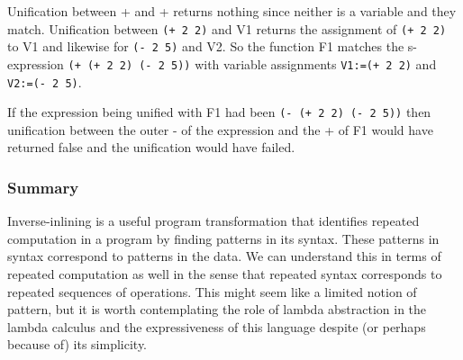 \documentclass[a4paper,10pt]{article}
\begin{document}
Unification between + and + returns nothing since neither is a variable and they match.  Unification between \texttt{(+ 2 2)} and V1 returns the assignment of \texttt{(+ 2 2)} to V1 and likewise for \texttt{(- 2 5)} and V2.  So the function F1 matches the s-expression \texttt{(+ (+ 2 2) (- 2 5))} with variable assignments \texttt{V1:=(+ 2 2)} and \texttt{V2:=(- 2 5)}.

If the expression being unified with F1 had been \texttt{(- (+ 2 2) (- 2 5))} then unification between the outer - of the expression and the + of F1 would have returned false and the unification would have failed.

\subsubsection{Summary}
Inverse-inlining is a useful program transformation that identifies repeated computation in a program by finding patterns in its syntax.  These patterns in syntax correspond to patterns in the data.  We can understand this in terms of repeated computation as well in the sense that repeated syntax corresponds to repeated sequences of operations.  This might seem like a limited notion of pattern, but it is worth contemplating the role of lambda abstraction in the lambda calculus and the expressiveness of this language despite (or perhaps because of) its simplicity.
\end{document}
